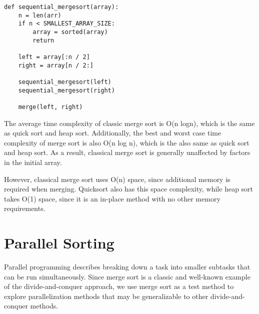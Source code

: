 \begin{verbatim}
def sequential_mergesort(array):
    n = len(arr)
    if n < SMALLEST_ARRAY_SIZE:
        array = sorted(array)
        return

    left = array[:n / 2]
    right = array[n / 2:]

    sequential_mergesort(left)
    sequential_mergesort(right)

    merge(left, right)
\end{verbatim}

The average time complexity of classic merge sort is O(n logn), which is the same as quick sort and heap sort.
Additionally, the best and worst case time complexity of merge sort is also O(n log n), which is the also same as quick
sort and heap sort. As a result, classical merge sort is generally unaffected by factors in the initial array.

However, classical merge sort uses O(n) space, since additional memory is required when merging. Quicksort also has this
space complexity, while heap sort takes O(1) space, since it is an in-place method with no other memory requirements.
\begin{comment}
\begin{table}[!ht]
    \centering
    \begin{tabular}{|l|l|l|l|}
    \hline
        Sort & Average Time Complexity & Best Time Complexity & Worst Time Complexity \\ \hline
        Bubble sort & $O(n^2)$ & O(n) & O(n\^2) \\ \hline
        Insertion sort & O(n\^2) & O(n) & O(n\^2) \\ \hline
        Selection sort & O(n\^2) & O(n\^2) & O(n\^2) \\ \hline
        Heap sort & O(nlogn) & O(nlogn) & O(nlogn) \\ \hline
        Quick sort & O(nlogn) & O(nlogn) & O(nlogn) \\ \hline
        Merge sort & O(nlogn) & O(nlogn) & O(nlogn) \\ \hline
    \end{tabular}
\end{table}
\end{comment}
\section{Parallel Sorting}

Parallel programming describes breaking down a task into smaller subtasks that can be run simultaneously. Since merge
sort is a classic and well-known example of the divide-and-conquer approach, we use merge sort as a test method to
explore parallelization methods that may be generalizable to other divide-and-conquer methods.

